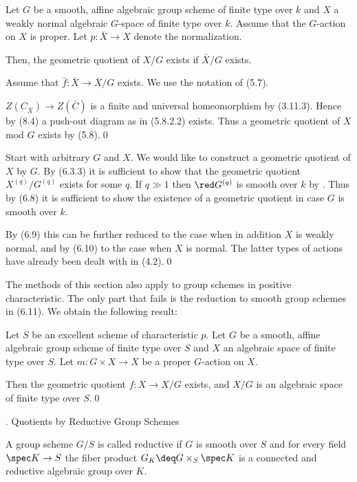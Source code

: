  Let $G$ be a smooth, affine algebraic group scheme of finite
type over $k$ and $X$ a weakly normal algebraic $G$-space of finite type
over $k$. Assume that the $G$-action on $X$ is proper.
Let $p:\bar X\to X$ denote the normalization.

Then, the geometric quotient of $X/G$ exists if
 $\bar X/G$ exists.
\endproclaim

\demop Assume that  $\bar f:\bar X\to \bar X/G$ exists.  We use the notation
of (5.7).

$Z(C_{\bar X})\to Z(\bar C)$ is a finite and universal homeomorphism by
(3.11.3).  Hence by (8.4)  a push-out diagram as in (5.8.2.2) exists. Thus a
geometric quotient of $X$ mod $G$ exists by (5.8).\qed\enddemo




  Start with arbitrary $G$ and $X$. We would like
to construct a geometric quotient of $X$ by $G$. By (6.3.3) it is sufficient
to show that the geometric quotient   $X^{(q)}/G^{(q)}$ exists for some $q$.
If
$q\gg 1$ then $\red G^{(q)}$ is smooth over $k$ by \cite{Weil62, p.25}. Thus by
(6.8) it is sufficient to show the existence of a geometric quotient
in case $G$ is smooth over $k$.

By (6.9) this can be further reduced to the case when in addition $X$ is
weakly normal, and by (6.10) to the case when $X$ is normal. The latter types
of actions have already been dealt with in (4.2).\qed
\enddemo


The methods of this section also apply to group schemes in positive
characteristic. The only part that fails is the reduction
to smooth group schemes in (6.11). We obtain the following result:



 Let $S$ be an excellent scheme of characteristic $p$.
Let  $G$ be a smooth, affine
algebraic group scheme   of finite type over $S$ and $X$ an algebraic
space  of finite type over $S$. Let $m:G\times X\to X$ be a proper $G$-action
on $X$.

Then the geometric quotient $f:X\to X/G$ exists, and $X/G$ is an
algebraic
space  of finite type over $S$.\qed
\endproclaim


. Quotients by Reductive Group Schemes
\endhead



 A  group scheme $G/S$ is called reductive if $G$ is
smooth over $S$ and for every field $\spec K\to S$ the fiber product $G_K\deq
G\times_S\spec K$ is a connected and reductive algebraic group over $K$.

